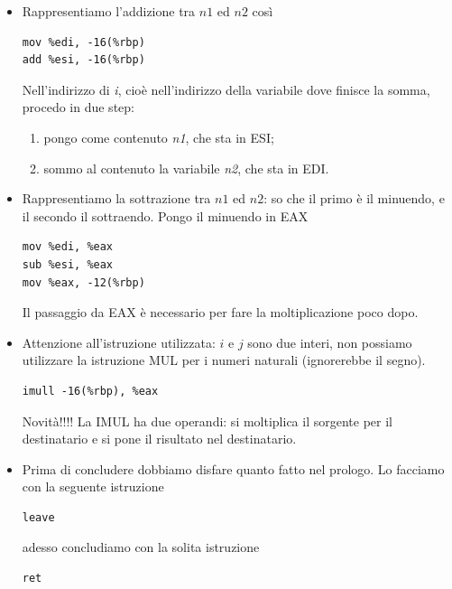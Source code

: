 \documentclass[11pt]{report}
\theoremstyle{definition}
\begin{document}
\begin{itemize}
\begin{framed}
\begin{center}
 \end{center} 
\end{framed}
\item Rappresentiamo l'addizione tra $n1$ ed $n2$ così
\begin{verbatim}    
mov %edi, -16(%rbp)
add %esi, -16(%rbp)
\end{verbatim}
Nell'indirizzo di \emph{i}, cioè nell'indirizzo della variabile dove finisce la somma, procedo in due step:
\begin{enumerate}
	\item pongo come contenuto \emph{n1}, che sta in ESI;
	\item sommo al contenuto la variabile \emph{n2}, che sta in EDI.
\end{enumerate}
\item Rappresentiamo la sottrazione tra $n1$ ed $n2$: so che il primo è il minuendo, e il secondo il sottraendo. Pongo il minuendo in EAX
\begin{verbatim}
mov %edi, %eax
sub %esi, %eax
mov %eax, -12(%rbp)
\end{verbatim}
Il passaggio da EAX è necessario per fare la moltiplicazione poco dopo.
\item Attenzione all'istruzione utilizzata: $i$ e $j$ sono due interi, non possiamo utilizzare la istruzione MUL per i numeri naturali (ignorerebbe il segno).  
\begin{verbatim}
imull -16(%rbp), %eax
\end{verbatim}
Novità!!!! La IMUL ha due operandi: si moltiplica il sorgente per il destinatario e si pone il risultato nel destinatario.
\item Prima di concludere dobbiamo disfare quanto fatto nel prologo. Lo facciamo con la seguente istruzione
\begin{verbatim}
leave
\end{verbatim}
adesso concludiamo con la solita istruzione
\begin{verbatim}
ret
\end{verbatim}
\end{itemize}
\end{document}
